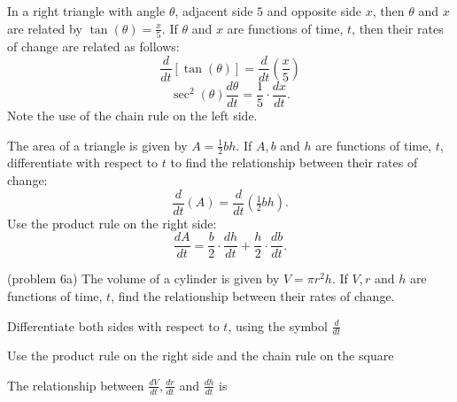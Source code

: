 \documentclass[handout]{ximera}
\begin{document}
\begin{example}[example 5]
In a right triangle with angle $\theta$, adjacent side $5$ and opposite side $x$, then 
$\theta$ and $x$ are related by $\tan (\theta) = \frac{x}{5}$. If $\theta$ and $x$ are functions of time, $t$, 
then their rates of change are related as follows:
\[\frac{d}{dt}[\tan (\theta)] = \frac{d}{dt} \left(\frac{x}{5}\right)\]
\[\sec^2(\theta) \frac{d\theta}{dt} = \frac{1}{5} \cdot \frac{dx}{dt}.\]
Note the use of the chain rule on the left side.
\end{example}



\begin{example}[example 6]
The area of a triangle is given by $A = \frac{1}{2} bh$. If $A, b$ and $h$ are functions of time, $t$, 
differentiate with respect to $t$ to find the relationship between their rates of change:
\[\frac{d}{dt}(A) = \frac{d}{dt}(\tfrac{1}{2} bh).\]
Use the product rule on the right side:
\[\frac{dA}{dt} = \frac{b}{2} \cdot \frac{dh}{dt}+ \frac{h}{2} \cdot \frac{db}{dt}.\]
\end{example}

\begin{problem}(problem 6a)
The volume of a cylinder is given by $V = \pi r^2h$. If $V, r$ and $h$ are functions of time, $t$,
find the relationship between their rates of change.\\
\begin{hint}
Differentiate both sides with respect to $t$, using the symbol $\frac{d}{dt}$
\end{hint}
\begin{hint}
Use the product rule on the right side and the chain rule on the square
\end{hint}

The relationship between $\frac{dV}{dt}, \frac{dr}{dt}$ and $\frac{dh}{dt}$ is
\begin{multipleChoice}
\end{multipleChoice}
\end{problem}
\end{document}
